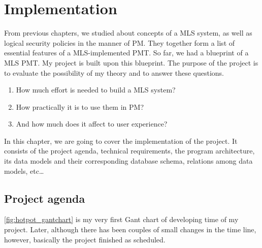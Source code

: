 
\chapter{Implementation} %

\label{ch:implementation} 


From previous chapters, we studied about concepts of a MLS system, as well as logical security policies in the manner of PM.
They together form a list of essential features of a MLS-implemented PMT.
So far, we had a blueprint of a MLS PMT. 
My \myProject project is built upon this blueprint.
The purpose of the project is to evaluate the possibility of my theory and to answer these questions.

\begin{enumerate}
\item How much effort is needed to build a MLS system? 
\item How practically it is to use them in PM?
\item And how much does it affect to user experience?
\end{enumerate}

In this chapter, we are going to cover the implementation of the project.
It consists of the project agenda, technical requirements, the program architecture, its data models and their corresponding database schema, relations among data models, etc\dots


\section{Project agenda}
\label{ch:implementation:project_agenda}

\autoref{fig:hotpot_gantchart} is my very first Gant chart of developing time of my project.
Later, although there has been couples of small changes in the time line, however, basically the project finished as scheduled.


